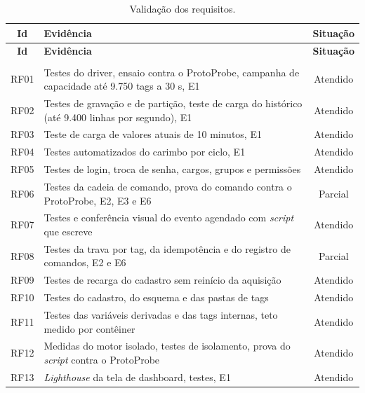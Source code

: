 {\renewcommand{\arraystretch}{1.3}\small
\begin{xltabular}{\textwidth}{cXc}
        \caption{Validação dos requisitos.}
        \label{tab:cap7_requisitos}\\
        \hline
        \textbf{Id} & \textbf{Evidência} & \textbf{Situação} \\
        \hline
        \endfirsthead
        \hline
        \textbf{Id} & \textbf{Evidência} & \textbf{Situação} \\
        \hline
        \endhead
        \endfoot
         \\
        \endlastfoot
        RF01 & Testes do driver, ensaio contra o ProtoProbe, campanha de capacidade até 9.750 tags a 30 s, E1 & Atendido \\
        \hline
        RF02 & Testes de gravação e de partição, teste de carga do histórico (até 9.400 linhas por segundo), E1 & Atendido \\
        \hline
        RF03 & Teste de carga de valores atuais de 10 minutos, E1 & Atendido \\
        \hline
        RF04 & Testes automatizados do carimbo por ciclo, E1 & Atendido \\
        \hline
        RF05 & Testes de login, troca de senha, cargos, grupos e permissões & Atendido \\
        \hline
        RF06 & Testes da cadeia de comando, prova do comando contra o ProtoProbe, E2, E3 e E6 & Parcial \\
        \hline
        RF07 & Testes e conferência visual do evento agendado com \emph{script} que escreve & Atendido \\
        \hline
        RF08 & Testes da trava por tag, da idempotência e do registro de comandos, E2 e E6 & Parcial \\
        \hline
        RF09 & Testes de recarga do cadastro sem reinício da aquisição & Atendido \\
        \hline
        RF10 & Testes do cadastro, do esquema e das pastas de tags & Atendido \\
        \hline
        RF11 & Testes das variáveis derivadas e das tags internas, teto medido por contêiner & Atendido \\
        \hline
        RF12 & Medidas do motor isolado, testes de isolamento, prova do \emph{script} contra o ProtoProbe & Atendido \\
        \hline
        RF13 & \emph{Lighthouse} da tela de dashboard, testes, E1 & Atendido \\

\end{xltabular}}
